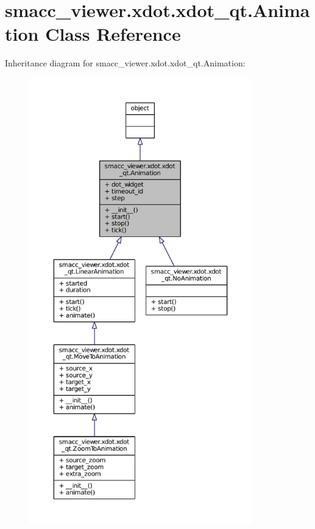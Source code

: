 \hypertarget{classsmacc__viewer_1_1xdot_1_1xdot__qt_1_1Animation}{}\section{smacc\+\_\+viewer.\+xdot.\+xdot\+\_\+qt.\+Animation Class Reference}
\label{classsmacc__viewer_1_1xdot_1_1xdot__qt_1_1Animation}


Inheritance diagram for smacc\+\_\+viewer.\+xdot.\+xdot\+\_\+qt.\+Animation\+:
\nopagebreak
\begin{figure}[H]
\begin{center}
\leavevmode
\includegraphics[height=550pt]{classsmacc__viewer_1_1xdot_1_1xdot__qt_1_1Animation__inherit__graph}
\end{center}
\end{figure}


